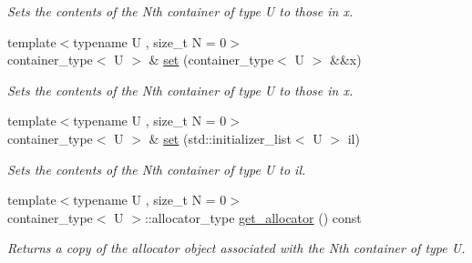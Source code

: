 \begin{DoxyCompactItemize}
\begin{DoxyCompactList}\small\item\em Sets the contents of the Nth container of type U to those in x. \end{DoxyCompactList}\item 
\hypertarget{classheterogeneous_1_1heterovector_3_01_t_00_01_types_8_8_8_4_ae27b0924a20cf18628170bf19edea330}{}{\footnotesize template$<$typename U , size\+\_\+t N = 0$>$ }\\container\+\_\+type$<$ U $>$ \& \hyperlink{classheterogeneous_1_1heterovector_3_01_t_00_01_types_8_8_8_4_ae27b0924a20cf18628170bf19edea330}{set} (container\+\_\+type$<$ U $>$ \&\&x)\label{classheterogeneous_1_1heterovector_3_01_t_00_01_types_8_8_8_4_ae27b0924a20cf18628170bf19edea330}

\begin{DoxyCompactList}\small\item\em Sets the contents of the Nth container of type U to those in x. \end{DoxyCompactList}\item 
\hypertarget{classheterogeneous_1_1heterovector_3_01_t_00_01_types_8_8_8_4_a32a429d59ddabf75546d4cf2647c91c1}{}{\footnotesize template$<$typename U , size\+\_\+t N = 0$>$ }\\container\+\_\+type$<$ U $>$ \& \hyperlink{classheterogeneous_1_1heterovector_3_01_t_00_01_types_8_8_8_4_a32a429d59ddabf75546d4cf2647c91c1}{set} (std\+::initializer\+\_\+list$<$ U $>$ il)\label{classheterogeneous_1_1heterovector_3_01_t_00_01_types_8_8_8_4_a32a429d59ddabf75546d4cf2647c91c1}

\begin{DoxyCompactList}\small\item\em Sets the contents of the Nth container of type U to il. \end{DoxyCompactList}\item 
\hypertarget{classheterogeneous_1_1heterovector_3_01_t_00_01_types_8_8_8_4_a92ed25699b3dc08efeca249eb2f2c3cb}{}{\footnotesize template$<$typename U , size\+\_\+t N = 0$>$ }\\container\+\_\+type$<$ U $>$\+::allocator\+\_\+type \hyperlink{classheterogeneous_1_1heterovector_3_01_t_00_01_types_8_8_8_4_a92ed25699b3dc08efeca249eb2f2c3cb}{get\+\_\+allocator} () const \label{classheterogeneous_1_1heterovector_3_01_t_00_01_types_8_8_8_4_a92ed25699b3dc08efeca249eb2f2c3cb}

\begin{DoxyCompactList}\small\item\em Returns a copy of the allocator object associated with the Nth container of type U. \end{DoxyCompactList}\end{DoxyCompactItemize}
